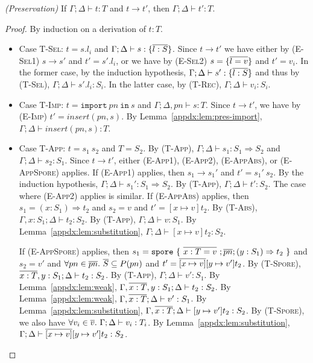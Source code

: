 \begin{theorem}
\emph{(Preservation)}
\label{appdx:th:pres}
If $\Gamma ; \Delta \vdash t : T$ and $t \rightarrow t'$, then $\Gamma ; \Delta \vdash t' : T$.
\end{theorem}
\begin{proof}
By induction on a derivation of $t : T$.

\begin{itemize}

\item Case \textsc{T-Sel}: $t = s.l_i$ and $\Gamma ; \Delta \vdash s : \{\overline{l : S}\}$. Since $t \rightarrow t'$ we have either by (\textsc{E-Sel1}) $s \rightarrow s'$ and $t' = s'.l_i$, or we have by (\textsc{E-Sel2}) $s = \{\overline{l = v}\}$ and $t' = v_i$. In the former case, by the induction hypothesis, $\Gamma ; \Delta \vdash s' : \{\overline{l : S}\}$ and thus by (\textsc{T-Sel}), $\Gamma ; \Delta \vdash s'.l_i : S_i$. In the latter case, by (\textsc{T-Rec}), $\Gamma ; \Delta \vdash v_i : S_i$.

\item Case \textsc{T-Imp}: $t = \texttt{import}~pn~\texttt{in}~s$ and $\Gamma ; \Delta, pn \vdash s : T$. Since $t \rightarrow t'$, we have by (\textsc{E-Imp}) $t' = insert(pn, s)$. By Lemma~\ref{appdx:lem:pres-import}, $\Gamma ; \Delta \vdash insert(pn, s) : T$.

\item Case \textsc{T-App}: $t = s_1~s_2$ and $T = S_2$. By (\textsc{T-App}), $\Gamma ; \Delta \vdash s_1 : S_1 \Rightarrow S_2$ and $\Gamma ; \Delta \vdash s_2 : S_1$. Since $t \rightarrow t'$, either (\textsc{E-App1}), (\textsc{E-App2}), (\textsc{E-AppAbs}), or (\textsc{E-AppSpore}) applies. If (\textsc{E-App1}) applies, then $s_1 \rightarrow s_1'$ and $t' = s_1'~s_2$. By the induction hypothesis, $\Gamma ; \Delta \vdash s_1' : S_1 \Rightarrow S_2$. By (\textsc{T-App}), $\Gamma ; \Delta \vdash t' : S_2$. The case where (\textsc{E-App2}) applies is similar. If (\textsc{E-AppAbs}) applies, then $s_1 = (x : S_1) \Rightarrow t_2$ and $s_2 = v$ and $t' = [x \mapsto v]t_2$. By (\textsc{T-Abs}), $\Gamma, x:S_1 ; \Delta \vdash t_2 : S_2$. By (\textsc{T-App}), $\Gamma ; \Delta \vdash v : S_1$. By Lemma~\ref{appdx:lem:substitution}, $\Gamma ; \Delta \vdash [x \mapsto v]t_2 : S_2$.

If (\textsc{E-AppSpore}) applies, then $s_1 = \texttt{spore}~\{~\overline{x : T = v}~; \overline{pn}; (y: S_1) \Rightarrow t_2~\}$ and $s_2 = v'$ and $\forall pn \in \overline{pn}.~\overline{S} \subseteq P(pn)$ and $t' = \overline{[x \mapsto v]}[y \mapsto v']t_2$. By (\textsc{T-Spore}), $\overline{x:T}, y:S_1 ; \Delta \vdash t_2 : S_2$. By (\textsc{T-App}), $\Gamma ; \Delta \vdash v' : S_1$. By Lemma~\ref{appdx:lem:weak}, $\Gamma, \overline{x:T}, y:S_1 ; \Delta \vdash t_2 : S_2$. By Lemma~\ref{appdx:lem:weak}, $\Gamma, \overline{x:T} ; \Delta \vdash v' : S_1$. By Lemma~\ref{appdx:lem:substitution}, $\Gamma, \overline{x:T} ; \Delta \vdash [y \mapsto v']t_2 : S_2$. By (\textsc{T-Spore}), we also have $\forall v_i \in \overline{v}.~\Gamma ; \Delta \vdash v_i : T_i$. By Lemma~\ref{appdx:lem:substitution}, $\Gamma ; \Delta \vdash \overline{[x \mapsto v]}[y \mapsto v']t_2 : S_2$.


\end{itemize}
\end{proof}
